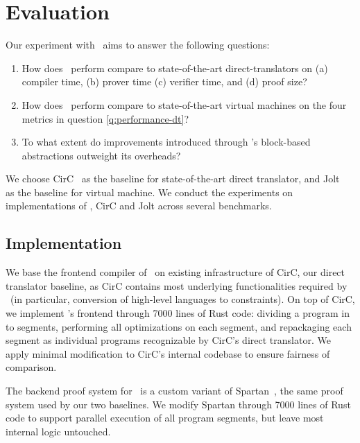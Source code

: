 \section{Evaluation}

Our experiment with \CoBBl~aims to answer the following questions:
\begin{enumerate}
  \item How does \CoBBl~perform compare to state-of-the-art direct-translators on (a) compiler time, (b) prover time (c) verifier time, and (d) proof size? \label{q:performance-dt}
  \item How does \CoBBl~perform compare to state-of-the-art virtual machines on the four metrics in question \ref{q:performance-dt}? \label{q:performance-vm}
  \item To what extent do improvements introduced through \CoBBl's block-based abstractions outweight its overheads? \label{q:tradeoff}
\end{enumerate}

We choose CirC~\cite{ozdemir20circ} as the baseline for state-of-the-art direct translator, and Jolt~\cite{arun23jolt} as the baseline for virtual machine.  We conduct the experiments on implementations of \CoBBl, CirC and Jolt across several benchmarks.

\subsection{Implementation}
 We base the frontend compiler of \CoBBl~on existing infrastructure of CirC, our direct translator baseline, as CirC contains most underlying functionalities required by \CoBBl~(in particular, conversion of high-level languages to constraints). On top of CirC, we implement \CoBBl's frontend through 7000 lines of Rust code: dividing a program in to segments, performing all optimizations on each segment, and repackaging each segment as individual programs recognizable by CirC's direct translator. We apply minimal modification to CirC's internal codebase to ensure fairness of comparison.

The backend proof system for \CoBBl~is a custom variant of Spartan~\cite{setty19spartan}, the same proof system used by our two baselines. We modify Spartan through 7000 lines of Rust code to support parallel execution of all program segments, but leave most internal logic untouched.

